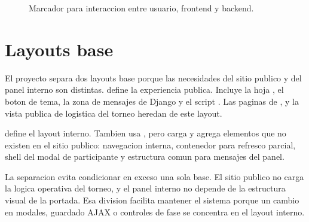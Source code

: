\begin{figure}[H]
  \centering
  \caption{Marcador para interaccion entre usuario, frontend y backend.}
  \label{fig:frontend-usuario-backend}
\end{figure}

\section{Layouts base}
\label{sec:frontend-layouts}

El proyecto separa dos layouts base porque las necesidades del sitio publico y del panel interno son distintas.  define la experiencia publica. Incluye la hoja , el boton de tema, la zona de mensajes de Django y el script . Las paginas de ,  y la vista publica de logistica del torneo heredan de este layout.

 define el layout interno. Tambien usa , pero carga  y agrega elementos que no existen en el sitio publico: navegacion interna, contenedor  para refresco parcial, shell del modal de participante y estructura comun para mensajes del panel.

La separacion evita condicionar en exceso una sola base. El sitio publico no carga la logica operativa del torneo, y el panel interno no depende de la estructura visual de la portada. Esa division facilita mantener el sistema porque un cambio en modales, guardado AJAX o controles de fase se concentra en el layout interno.

